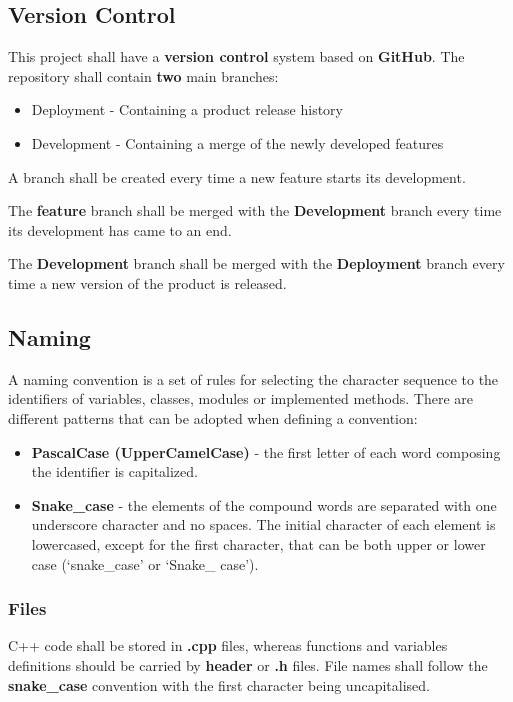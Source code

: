 \documentclass{scrreprt}
\begin{document}
\subsection{Version Control}

This project shall have a \textbf{version control} system based on \textbf{GitHub}. The repository shall contain \textbf{two} main branches:

\begin{itemize}
\item Deployment - Containing a product release history
\item Development - Containing a merge of the newly developed features
\end{itemize}

\par A branch shall be created every time a new feature starts its development.
\par The \textbf{feature} branch shall be merged with the \textbf{Development} branch every time its development has came to an end.
\par The \textbf{Development} branch shall be merged with the \textbf{Deployment} branch every time a new version of the product is released.

\subsection{Naming}
A naming convention is a set of rules for selecting the character sequence to the identifiers of variables, classes, modules or implemented methods. There are different patterns that can be adopted when defining a convention:

\begin{itemize}
\item \textbf{PascalCase (UpperCamelCase)} - the first letter of each word composing the identifier is capitalized.
\item \textbf{Snake_case} - the elements of the compound words are separated with one underscore character and no spaces. The initial character of each element is lowercased, except for the first character, that can be both upper or lower case (‘snake_case’ or ‘Snake_
case’).
\end{itemize}

\subsubsection{Files}

\par C++ code shall be stored in \textbf{.cpp} files, whereas functions and variables definitions should be carried by \textbf{header} or \textbf{.h} files. File names shall follow the \textbf{snake_case} convention with the first character being uncapitalised.
\end{document}
